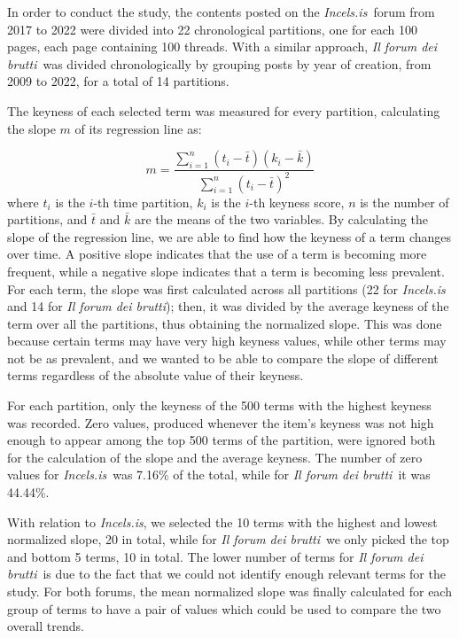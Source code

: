 \documentclass[11pt]{article}
\newcommand{\enforum}{\textit{Incels.is}}
\newcommand{\itforum}{\textit{Il forum dei brutti}}
\begin{document}
In order to conduct the study, the contents posted on the \enforum\, forum from 2017 to 2022 were divided into 22 chronological partitions, one for each 100 pages, each page containing 100 threads. With a similar approach, \itforum\, was divided chronologically by grouping posts by year of creation, from 2009 to 2022, for a total of 14 partitions. 

The keyness of each selected term was measured for every partition, calculating the slope $m$ of its regression line as:


\begin{equation}
  \label{eq:slope}
  m = \frac{\sum_{i=1}^{n} (t_i - \bar{t})(k_i - \bar{k})}{\sum_{i=1}^{n} (t_i - \bar{t})^2}
\end{equation}
where $t_i$ is the $i$-th time partition, $k_i$ is the $i$-th keyness score, $n$ is the number of partitions, and $\bar{t}$ and $\bar{k}$ are the means of the two variables. By calculating the slope of the regression line, we are able to find how the keyness of a term changes over time. A positive slope indicates that the use of a term is becoming more frequent, while a negative slope indicates that a term is becoming less prevalent. For each term, the slope was first calculated across all partitions (22 for \enforum\, and 14 for \itforum); then, it was divided by the average keyness of the term over all the partitions, thus obtaining the normalized slope. This was done because certain terms may have very high keyness values, while other terms may not be as prevalent, and we wanted to be able to compare the slope of different terms regardless of the absolute value of their keyness.

For each partition, only the keyness of the 500 terms with the highest keyness was recorded. Zero values, produced whenever the item's keyness was not high enough to appear among the top 500 terms of the partition, were ignored both for the calculation of the slope and the average keyness. The number of zero values for \enforum\, was 7.16\% of the total, while for \itforum\, it was 44.44\%.

With relation to \enforum, we selected the 10 terms with the highest and lowest normalized slope, 20 in total, while for \itforum\, we only picked the top and bottom 5 terms, 10 in total. The lower number of terms for \itforum\, is due to the fact that we could not identify enough relevant terms for the study. For both forums, the mean normalized slope was finally calculated for each group of terms to have a pair of values which could be used to compare the two overall trends.
\end{document}

